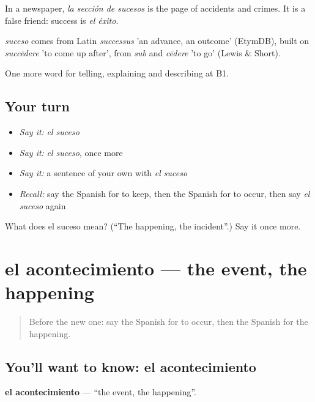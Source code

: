 In a newspaper, \emph{la sección de sucesos} is the page of accidents and crimes. It is a false friend: success is \emph{el éxito}.

\begin{cousinweb}
\emph{suceso} comes from Latin \emph{successus} 'an advance, an outcome' (EtymDB), built on \emph{succēdere} 'to come up after', from \emph{sub} and \emph{cēdere} 'to go' (Lewis \& Short).
\end{cousinweb}

\begin{grammarlens}[title={What you've built}]
One more word for telling, explaining and describing at B1.
\end{grammarlens}

\subsection*{Your turn}
\begin{itemize}
\raggedright
  \item \emph{Say it:} \emph{el suceso}
  \item \emph{Say it:} \emph{el suceso}, once more
  \item \emph{Say it:} a sentence of your own with \emph{el suceso}
  \item \emph{Recall:} say the Spanish for to keep, then the Spanish for to occur, then say \emph{el suceso} again
\end{itemize}

\begin{tcolorbox}[breakable,colback=teal!4,colframe=teal!35!black,title={Before you move on}]
What does el suceso mean? (\textquotedblleft{}The happening, the incident\textquotedblright{}.) Say it once more.
\end{tcolorbox}
\section[el acontecimiento]{el acontecimiento — the event, the happening}

\label{lesson:ES-C512-acontecimiento}



\begin{quote}
Before the new one: say the Spanish for to occur, then the Spanish for the happening.
\end{quote}

\subsection*{You'll want to know: el acontecimiento}
\textbf{el acontecimiento} — \textquotedblleft{}the event, the happening\textquotedblright{}.

